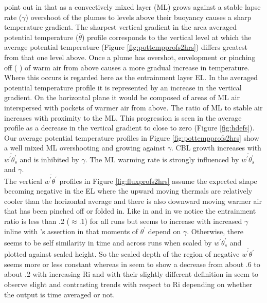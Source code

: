 \citeauthor{SchmidtSchu} point out in \cite{SchmidtSchu} that as a convectively mixed layer (\acs{ML})
grows against a stable lapse rate ($\gamma$) overshoot of the plumes to levels above their buoyancy causes
a sharp temperature gradient.  The sharpest vertical gradient in the area averaged potential temperature ($\overline{\theta}$)
profile corresponds to the vertical level at which the average potential temperature (Figure \ref{fig:pottempprofs2hrs}) differs greatest from that one level above.  Once a plume has overshot, envelopment or pinching off (\citeauthor{SullMoengStev} 
\cite{SullMoengStev}) of warm air from above causes a more gradual increase in temperature.  
Where this occurs is regarded here as the entrainment layer \acs{EL}.  In the averaged potential temperature 
profile it is represented by an increase in the vertical gradient. On the horizontal plane it would be composed 
of areas of \acs{ML} air interspersed with pockets of warmer air from above.  The ratio of \acs{ML} to stable air 
increases with proximity to the \acs{ML}.  This progression is seen in the average profile as a decrease in the
vertical gradient to close to zero (Figure \ref{fig:hdefs}).  Our average potential temperature profiles in Figure \ref{fig:pottempprofs2hrs} show a well mixed \acs{ML} overshooting
and growing against $\gamma$.  \acs{CBL} growth increases with $\overline{w^{'}\theta^{'}_{s}}$ and is inhibited 
by $\gamma$.  The \acs{ML} warming rate is strongly influenced by $\overline{w^{'}\theta^{'}_{s}}$ and $\gamma$.\\

The vertical $\overline{w^{'}\theta^{'}}$ profiles in Figure \ref{fig:fluxprofs2hrs} assume the expected shape becoming negative in the \acs{EL}
where the upward moving thermals are relatively cooler than the horizontal average and there is also downward
moving warmer air that has been pinched off or folded in.  Like \citeauthor{SullMoengStev} in \cite{SullMoengStev}
and \citeauthor{FedConzMir04} in \cite{FedConzMir04} we notice the entrainment ratio is less than .2 ($\approx .1$) 
for all runs but seems to increase with increased $\gamma$ inline with \citeauthor{Sorbjan}'s assertion in \cite{Sorbjan} 
that moments of $\theta^{'}$ depend on $\gamma$. Otherwise, there seems to be self similarity in time and across runs
when scaled by $\overline{w^{'}\theta^{'}_{s}}$ and plotted against scaled height.  So the scaled depth of the 
region of negative  $\overline{w^{'}\theta^{'}}$ seems more or less constant whereas \citeauthor{FedConzMir04} in 
\cite{FedConzMir04} seem to show a decrease from about .6 to about .2 with increasing \acs{Ri} and \citeauthor{BrooksFowler2}
with their slightly different definition in \cite{BrooksFowler2} seem to observe slight and contrasting trends with
respect to \acs{Ri} depending on whether the output is time averaged or not.



